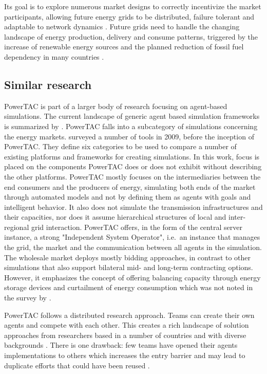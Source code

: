 Its goal is to explore numerous market designs to correctly incentivize the market participants, allowing future
energy grids to be distributed, failure tolerant and adaptable to network dynamics \citep{ketter2015competitive}. Future
grids need to handle the changing landscape of energy production, delivery and consume patterns, triggered by the
increase of renewable energy sources and the planned reduction of fossil fuel dependency in many countries
\citep[p.13]{smartgrids2012smartgrids}.  

\subsection{Similar research}%

\ac{PowerTAC} is part of a larger body of research focusing on agent-based simulations. The current landscape of generic
agent based simulation frameworks is summarized by \citet{abar2017agent}. \ac{PowerTAC} falls into a subcategory of
simulations concerning the energy markets. \citet{zhou2007agent} surveyed a number of tools in 2009, before the
inception of \ac{PowerTAC}. They define six categories to be used to compare a number of existing platforms and
frameworks for creating simulations. In this work, focus is placed on the components \ac{PowerTAC} does or does not
exhibit without describing the other platforms. \ac{PowerTAC} mostly focuses on the intermediaries between the end
consumers and the producers of energy, simulating both ends of the market through automated models and not by defining
them as agents with goals and intelligent behavior. It also does not simulate the transmission infrastructures and their
capacities, nor does it assume hierarchical structures of local and inter-regional grid interaction. \ac{PowerTAC} offers,
in the form of the central server instance, a strong "Independent System Operator", i.e.\ an instance that manages the
grid, the market and the communication between all agents in the simulation. The wholesale market deploys mostly
bidding approaches, in contrast to other simulations that also support bilateral mid- and long-term contracting options.
However, it emphasizes the concept of offering balancing capacity through energy storage devices and curtailment of
energy consumption which was not noted in the survey by \citet{zhou2007agent}.

\ac{PowerTAC} follows a distributed research approach. Teams can create their own agents and compete with each
other. This creates a rich landscape of solution approaches from researchers based in a number of countries and with
diverse backgrounds \citep{ketter2015competitive}. There is one drawback: few teams have opened their agents
implementations to others which increases the entry barrier and may lead to duplicate efforts that could have been
reused \citep{boettiger2015introduction}.

